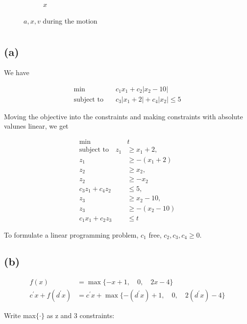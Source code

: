 \documentclass{article}
\newcommand{\1}{\bm 1}
\begin{document}
\begin{figure}
\begin{subfigure}[b]{0.3\textwidth}
        \caption{$x$}
    \end{subfigure}
       \caption{$a, x, v$ during the motion}
\end{figure}

\section{}

\subsection*{(a)} 

We have 

\begin{align*}
    \min \quad & c_1 x_1 + c_2 | x_2 -10| \\
    \text{subject to}\quad & c_3 | x_1 + 2 | + c_4 | x_2 | \le 5 
\end{align*}

Moving the objective into the constraints and making constraints with absolute valunes linear, we get

\begin{align*}
    \min \quad & t\\
    \text{subject to}\quad  z_1  & \geq  x_1 +2, \\
    z_1  & \geq -(x_1 + 2) \\
    z_2  & \geq  x_2 ,\\
    z_2  & \geq  -x_2\\
    c_3 z_1 + c_4 z_2 & \le 5, \\
    z_3  & \geq x_2 - 10 ,\\
    z_3  & \geq -(x_2 - 10)\\
    c_1 x_1 + c_2 z_3 & \le  t
\end{align*}

To formulate a linear programming problem, $c_1$ free, $c_2, c_3, c_4 \geq 0 $.

\subsection*{(b)} 

\begin{align*}
    f(x) & = \max{\{-x+1, \quad 0, \quad 2x - 4\}}\\
    c^{'}x + f(d^{'}x) & = c^{'}x + \max{\{-(d^{'}x) + 1, \quad 0, \quad 2(d^{'}x) - 4\}}
\end{align*}

Write max$\{\cdot\}$ as z and 3 constraints:
\end{document}
